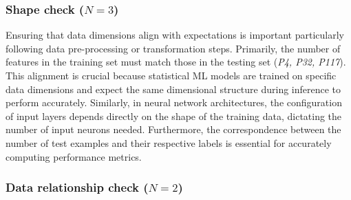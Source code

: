 \subsubsection{Shape check ($N = 3$)}

Ensuring that data dimensions align with expectations is important particularly following data pre-processing or transformation steps. Primarily, the number of features in the training set must match those in the testing set (\emph{P4, P32, P117}). This alignment is crucial because statistical ML models are trained on specific data dimensions and expect the same dimensional structure during inference to perform accurately. Similarly, in neural network architectures, the configuration of input layers depends directly on the shape of the training data, dictating the number of input neurons needed. Furthermore, the correspondence between the number of test examples and their respective labels is essential for accurately computing performance metrics.


\subsubsection{Data relationship check ($N = 2$)}~\label{sec:linear-relation-output}

